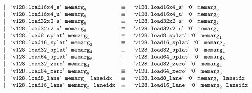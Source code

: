 $$\begin{array}[t]{@{}lrrl@{}l@{}l@{}l@{}}
& & | & \mbox{‘\texttt{v128.load16x4\_s}’}~~{{\mathtt{memarg}}}_{8} & \quad\equiv\quad{} & \mbox{‘\texttt{v128.load16x4\_s}’}~~\mbox{‘\texttt{0}’}~~{{\mathtt{memarg}}}_{8} \\
& & | & \mbox{‘\texttt{v128.load16x4\_u}’}~~{{\mathtt{memarg}}}_{8} & \quad\equiv\quad{} & \mbox{‘\texttt{v128.load16x4\_u}’}~~\mbox{‘\texttt{0}’}~~{{\mathtt{memarg}}}_{8} \\
& & | & \mbox{‘\texttt{v128.load32x2\_s}’}~~{{\mathtt{memarg}}}_{8} & \quad\equiv\quad{} & \mbox{‘\texttt{v128.load32x2\_s}’}~~\mbox{‘\texttt{0}’}~~{{\mathtt{memarg}}}_{8} \\
& & | & \mbox{‘\texttt{v128.load32x2\_u}’}~~{{\mathtt{memarg}}}_{8} & \quad\equiv\quad{} & \mbox{‘\texttt{v128.load32x2\_u}’}~~\mbox{‘\texttt{0}’}~~{{\mathtt{memarg}}}_{8} \\
& & | & \mbox{‘\texttt{v128.load8\_splat}’}~~{{\mathtt{memarg}}}_{1} & \quad\equiv\quad{} & \mbox{‘\texttt{v128.load8\_splat}’}~~\mbox{‘\texttt{0}’}~~{{\mathtt{memarg}}}_{1} \\
& & | & \mbox{‘\texttt{v128.load16\_splat}’}~~{{\mathtt{memarg}}}_{2} & \quad\equiv\quad{} & \mbox{‘\texttt{v128.load16\_splat}’}~~\mbox{‘\texttt{0}’}~~{{\mathtt{memarg}}}_{2} \\
& & | & \mbox{‘\texttt{v128.load32\_splat}’}~~{{\mathtt{memarg}}}_{4} & \quad\equiv\quad{} & \mbox{‘\texttt{v128.load32\_splat}’}~~\mbox{‘\texttt{0}’}~~{{\mathtt{memarg}}}_{4} \\
& & | & \mbox{‘\texttt{v128.load64\_splat}’}~~{{\mathtt{memarg}}}_{8} & \quad\equiv\quad{} & \mbox{‘\texttt{v128.load64\_splat}’}~~\mbox{‘\texttt{0}’}~~{{\mathtt{memarg}}}_{8} \\
& & | & \mbox{‘\texttt{v128.load32\_zero}’}~~{{\mathtt{memarg}}}_{4} & \quad\equiv\quad{} & \mbox{‘\texttt{v128.load32\_zero}’}~~\mbox{‘\texttt{0}’}~~{{\mathtt{memarg}}}_{4} \\
& & | & \mbox{‘\texttt{v128.load64\_zero}’}~~{{\mathtt{memarg}}}_{8} & \quad\equiv\quad{} & \mbox{‘\texttt{v128.load64\_zero}’}~~\mbox{‘\texttt{0}’}~~{{\mathtt{memarg}}}_{8} \\
& & | & \mbox{‘\texttt{v128.load8\_lane}’}~~{{\mathtt{memarg}}}_{1}~~{\mathtt{laneidx}} & \quad\equiv\quad{} & \mbox{‘\texttt{v128.load8\_lane}’}~~\mbox{‘\texttt{0}’}~~{{\mathtt{memarg}}}_{1}~~{\mathtt{laneidx}} \\
& & | & \mbox{‘\texttt{v128.load16\_lane}’}~~{{\mathtt{memarg}}}_{2}~~{\mathtt{laneidx}} & \quad\equiv\quad{} & \mbox{‘\texttt{v128.load16\_lane}’}~~\mbox{‘\texttt{0}’}~~{{\mathtt{memarg}}}_{2}~~{\mathtt{laneidx}} \\

\end{array}$$
